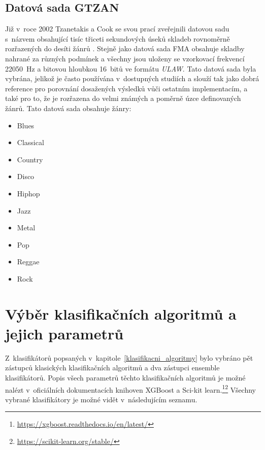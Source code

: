 \subsection*{Datová sada GTZAN}
Již v~roce 2002 Tzanetakis a Cook se svou prací zveřejnili datovou sadu s~názvem  obsahující tisíc třiceti sekundových úseků skladeb rovnoměrně rozřazených do desíti žánrů \cite{1021072}. Stejně jako datová sada FMA obsahuje skladby nahrané za různých podmínek a všechny jsou uloženy se vzorkovací frekvencí 22050~Hz a bitovou hloubkou 16~bitů ve formátu \textit{ULAW}. Tato datová sada byla vybrána, jelikož je často používána v~dostupných studiích a slouží tak jako dobrá reference pro porovnání dosažených výsledků vůči ostatním implementacím, a také pro to, že je rozřazena do velmi známých a poměrně úzce definovaných žánrů. Tato datová sada obsahuje žánry:

\begin{itemize}
    \item Blues
    \item Classical
    \item Country
    \item Disco
    \item Hiphop
    \item Jazz
    \item Metal
    \item Pop
    \item Reggae
    \item Rock
\end{itemize}

\section{Výběr klasifikačních algoritmů a jejich parametrů}
\label{NIS_vyber_klasifikacnich_algoritmu_a_jejich_parametru}
Z~klasifikátorů popsaných v~kapitole~\ref{klasifikacni_algoritmy} bylo vybráno pět zástupců klasických klasifikačních algoritmů a dva zástupci ensemble klasifikátorů. Popis všech parametrů těchto klasifikačních algoritmů je možné nalézt v~oficiálních dokumentacích knihoven XGBoost a Sci-kit learn.\footnote{\url{https://xgboost.readthedocs.io/en/latest/}}\footnote{\url{https://scikit-learn.org/stable/}} Všechny vybrané klasifikátory je možné vidět v~následujícím seznamu.

